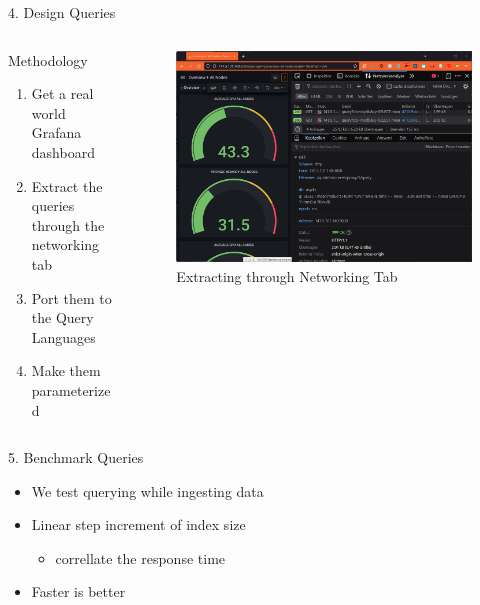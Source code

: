 \documentclass[compress,aspectratio=169]{beamer}
\begin{document}
\begin{frame}{4. Design Queries}
\begin{columns}[T]
\begin{column}{0.5\textwidth}
\begin{block}{Methodology}
\begin{enumerate}
  \item Get a real world Grafana dashboard
  \item Extract the queries through the networking tab
  \item Port them to the Query Languages
  \item Make them parameterized
\end{enumerate}
\end{block}
\end{column}
\begin{column}{0.5\textwidth}
\begin{figure}
  \centering
  \includegraphics[width=\textwidth]{networking.png}
  \caption{Extracting through Networking Tab}
\end{figure}
\end{column}
\end{columns}
\end{frame}

\begin{frame}{5. Benchmark Queries}
\begin{itemize}
  \item We test querying while ingesting data
  \item Linear step increment of index size
  \begin{itemize}
    \item correllate the response time
  \end{itemize}
\item Faster is better
\end{itemize}
\end{frame}
\end{document}
